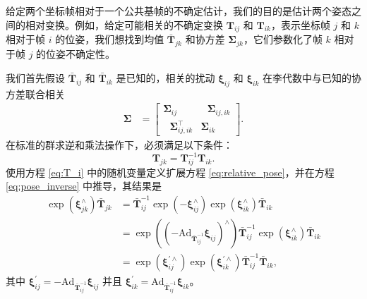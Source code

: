 给定两个坐标帧相对于一个公共基帧的不确定估计，我们的目的是估计两个姿态之间的相对变换。例如，给定可能相关的不确定变换 $\mathbf{T}_{ij}$ 和 $\mathbf{T}_{ik}$，表示坐标帧 $j$ 和 $k$ 相对于帧 $i$ 的位姿，我们想找到均值 $\bar{\mathbf{T}}_{jk}$ 和协方差 $\boldsymbol{\Sigma}_{jk}$，它们参数化了帧 $k$ 相对于帧 $j$ 的位姿不确定性。 

我们首先假设 $\bar{\mathbf{T}}_{ij}$ 和 $\bar{\mathbf{T}}_{ik}$ 是已知的，相关的扰动 
$\boldsymbol{\xi}_{ij}$ 和 $\boldsymbol{\xi}_{ik}$
在李代数中与已知的协方差联合相关 
\begin{align}
    \boldsymbol{\Sigma} 
    &= 
    \left[ \begin{array}{cc}
        \boldsymbol{\Sigma}_{ij} & ~~~\boldsymbol{\Sigma}_{ij,ik}  \\
        ~~~\boldsymbol{\Sigma}_{ij,ik}^\top & \boldsymbol{\Sigma}_{ik}
    \end{array} \right]. \nonumber
\end{align} 
在标准的群求逆和乘法操作下，必须满足以下条件：
\begin{equation}
    \mathbf{T}_{jk} = \mathbf{T}_{ij}^{-1} \mathbf{T}_{ik}. \label{eq:relative_pose}
\end{equation}
使用方程 \eqref{eq:T_i} 中的随机变量定义扩展方程 \eqref{eq:relative_pose}，并在方程 \eqref{eq:pose_inverse} 中推导，其结果是 
\begin{align}
    \operatorname{exp}(\boldsymbol{\xi}_{jk}^\wedge) \bar{\mathbf{T}}_{jk} 
    &= 
    \bar{\mathbf{T}}_{ij}^{-1}
    \operatorname{exp}(-\boldsymbol{\xi}_{ij}^\wedge) 
    \operatorname{exp}(\boldsymbol{\xi}_{ik}^\wedge) \bar{\mathbf{T}}_{ik} \\
    &= 
    \operatorname{exp}((-\mathrm{Ad}_{\bar{\mathbf{T}}_{ij}^{-1}}\boldsymbol{\xi}_{ij})^\wedge) \bar{\mathbf{T}}_{ij}^{-1}
    \operatorname{exp}(\boldsymbol{\xi}_{ik}^\wedge) \bar{\mathbf{T}}_{ik} \nonumber\\
    &= 
    \operatorname{exp}(\boldsymbol{\xi}_{ij}^{\prime\wedge})
    \operatorname{exp}(\boldsymbol{\xi}_{ik}^{\prime\wedge})
    \bar{\mathbf{T}}_{ij}^{-1}
     \bar{\mathbf{T}}_{ik}, \nonumber     
\end{align}
其中 $\boldsymbol{\xi}_{ij}^\prime = -\mathrm{Ad}_{\bar{\mathbf{T}}_{ij}^{-1}}\boldsymbol{\xi}_{ij}$ 并且 $\boldsymbol{\xi}_{ik}^\prime = \mathrm{Ad}_{\bar{\mathbf{T}}_{ij}^{-1}}\boldsymbol{\xi}_{ik}$。 %
